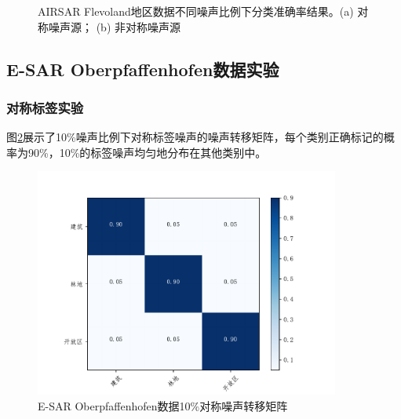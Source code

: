 \begin{figure}[ht!]
    \caption{AIRSAR Flevoland地区数据不同噪声比例下分类准确率结果。(a) 对称噪声源； (b) 非对称噪声源}
    \label{fig:fle_noise}
\end{figure}

\subsection{E-SAR Oberpfaffenhofen数据实验}
\subsubsection{对称标签实验}
图\ref{fig:ober_noise_uniform}展示了10\%噪声比例下对称标签噪声的噪声转移矩阵，每个类别正确标记的概率为90\%，10\%的标签噪声均匀地分布在其他类别中。
\begin{figure}[ht!]
    \centering
    \includegraphics[width=10.04cm]{pic/chapter4/ober/noise_uniform.pdf}
    \caption{E-SAR Oberpfaffenhofen数据10\%对称噪声转移矩阵}
    \label{fig:ober_noise_uniform}
\end{figure}

